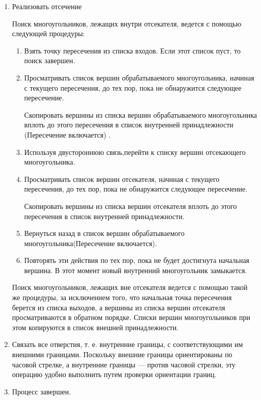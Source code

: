 \documentclass[12pt]{article}
\begin{document}
\begin{enumerate}
\begin{enumerate}
\end{enumerate}

\item Реализовать отсечение

Поиск многоугольников, лежащих внутри отсекателя, ведется с помощью следующей процедуры:

\begin{enumerate}
\item Взять точку пересечения из списка входов. Если этот список пуст, то поиск завершен.


\item Просматривать список вершин обрабатываемого многоугольника, начиная с текущего пересечения,  до тех пор, пока не обнаружится следующее пересечение.

Скопировать вершины из списка вершин обрабатываемого многоугольника вплоть до этого
пересечения в список внутренней принадлежности (Пересечение включается) .


\item Используя двустороннюю связь,перейти к списку вершин отсекающего многоугольника.

\item Просматривать список вершин отсекателя, начиная с текущего пересечения,  до тех пор, пока не обнаружится следующее пересечение.

Скопировать вершины из списка вершин отсекателя вплоть до этого пересечения в список
внутренней принадлежности.

\item Вернуться назад в список вершин обрабатываемого многоугольника(Пересечение включается).

\item Повторять эти действия по тех пор, пока не будет достигнута начальная вершина. В этот
момент новый внутренний многоугольник замыкается.

\end{enumerate}

Поиск многоугольников, лежащих вне отсекателя ведется с помощью такой же процедуры, за исключением того, что начальная точка пересечения берется из списка выходов, а вершины из
списка вершин отсекателя просматриваются в обратном порядке. Списки вершин многоугольников при этом копируются в список внешней принадлежности.
\item Связать все отверстия, т. е. внутренние границы, с соответствующими им внешними границами.
Поскольку внешние границы ориентированы по часовой стрелке, а внутренние границы — против
часовой стрелки, эту операцию удобно выполнить путем проверки ориентации границ.


\item  Процесс завершен.




\end{enumerate}
\end{document}
